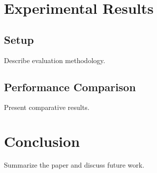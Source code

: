 \documentclass[journal]{IEEEtran}
\begin{document}
\section{Experimental Results}
\subsection{Setup}
Describe evaluation methodology.

\subsection{Performance Comparison}
Present comparative results.

\section{Conclusion}
Summarize the paper and discuss future work.



\end{document}
